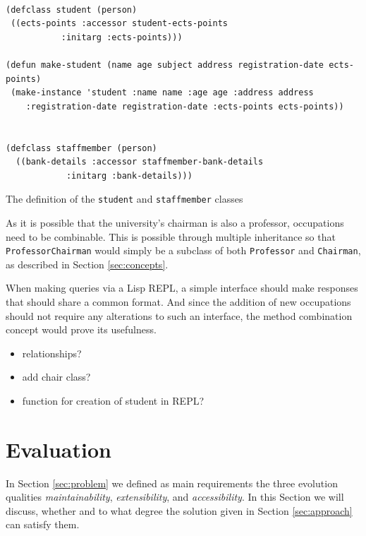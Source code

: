 \documentclass[oribibl]{llncs}
\begin{document}
\begin{listing}[]%
\begin{verbatim}

(defclass student (person)
 ((ects-points :accessor student-ects-points
           :initarg :ects-points)))

(defun make-student (name age subject address registration-date ects-points)
 (make-instance 'student :name name :age age :address address
    :registration-date registration-date :ects-points ects-points))
    
    
(defclass staffmember (person)
  ((bank-details :accessor staffmember-bank-details
            :initarg :bank-details)))

\end{verbatim}
\caption{The definition of the \texttt{student} and \texttt{staffmember} classes}
\label{lst:student}
\end{listing}



As it is possible that the university's chairman is also a professor, occupations need to be combinable. This is possible through multiple inheritance so that \texttt{ProfessorChairman} would simply be a subclass of both \texttt{Professor} and \texttt{Chairman}, as described in Section \ref{sec:concepts}. 



When making queries via a Lisp REPL, a simple interface should make responses that should share a common format. And since the addition of new occupations should not require any alterations to such an interface, the method combination concept would prove its usefulness. 



\begin{itemize}
\item relationships?
\item add chair class?
\item function for creation of student in REPL?

\end{itemize}




\section{Evaluation}
\label{sec:evaluation}

In Section \ref{sec:problem} we defined as main requirements the three  evolution qualities \emph{maintainability}, \emph{extensibility}, and \emph{accessibility}. In this Section we will discuss, whether and to what degree the solution given in Section \ref{sec:approach} can satisfy them.
\end{document}
